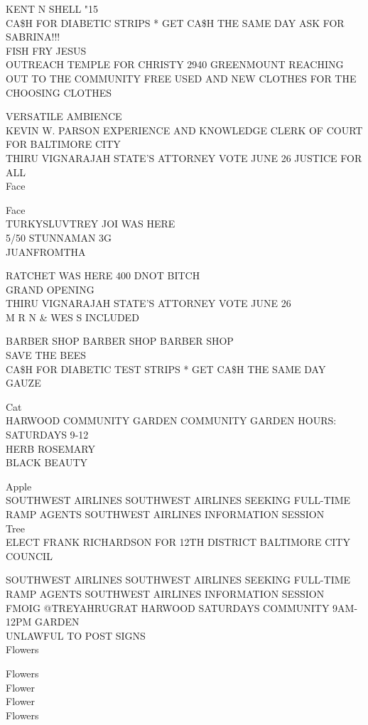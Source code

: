 \documentclass[10pt,letterpaper]{article}
\begin{document}
KENT N SHELL "15\\
CA\$H FOR DIABETIC STRIPS * GET CA\$H THE SAME DAY ASK FOR SABRINA!!!\\
FISH FRY JESUS\\
OUTREACH TEMPLE FOR CHRISTY 2940 GREENMOUNT REACHING OUT TO THE COMMUNITY FREE USED AND NEW CLOTHES FOR THE CHOOSING CLOTHES

VERSATILE AMBIENCE\\
KEVIN W. PARSON EXPERIENCE AND KNOWLEDGE CLERK OF COURT FOR BALTIMORE CITY\\
THIRU VIGNARAJAH STATE'S ATTORNEY VOTE JUNE 26 JUSTICE FOR ALL\\
Face

Face\\
TURKYSLUVTREY JOI WAS HERE\\
5/50 STUNNAMAN 3G\\
JUANFROMTHA

RATCHET WAS HERE 400 DNOT BITCH\\
GRAND OPENING\\
THIRU VIGNARAJAH STATE'S ATTORNEY VOTE JUNE 26\\
M R N \& WES S INCLUDED

BARBER SHOP BARBER SHOP BARBER SHOP\\
SAVE THE BEES\\
CA\$H FOR DIABETIC TEST STRIPS * GET CA\$H THE SAME DAY\\
GAUZE

Cat\\
HARWOOD COMMUNITY GARDEN COMMUNITY GARDEN HOURS: SATURDAYS 9{-}12\\
HERB ROSEMARY\\
BLACK BEAUTY

Apple\\
SOUTHWEST AIRLINES SOUTHWEST AIRLINES SEEKING FULL{-}TIME RAMP AGENTS SOUTHWEST AIRLINES INFORMATION SESSION\\
Tree\\
ELECT FRANK RICHARDSON FOR 12TH DISTRICT BALTIMORE CITY COUNCIL

SOUTHWEST AIRLINES SOUTHWEST AIRLINES SEEKING FULL{-}TIME RAMP AGENTS SOUTHWEST AIRLINES INFORMATION SESSION\\
FMOIG @TREYAHRUGRAT HARWOOD SATURDAYS COMMUNITY 9AM{-}12PM GARDEN\\
UNLAWFUL TO POST SIGNS\\
Flowers

Flowers\\
Flower\\
Flower\\
Flowers
\end{document}
